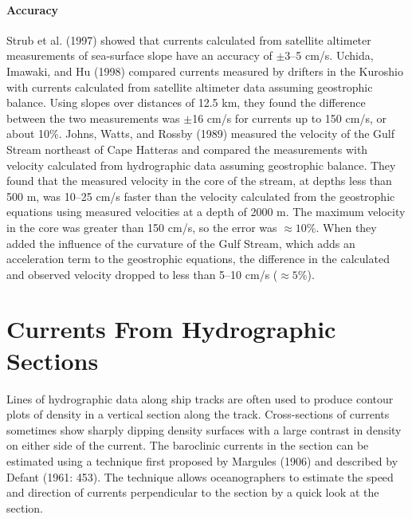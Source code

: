 \paragraph{Accuracy} Strub et al. (1997) showed that
currents calculated from satellite altimeter
measurements of sea-surface slope have an accuracy of
$\pm$3--5 cm/s. Uchida, Imawaki, and Hu (1998) compared currents measured by
drifters in the Kuroshio
with currents calculated from satellite altimeter data assuming
geostrophic balance. Using slopes over distances of 12.5 km, they found the difference between
the two measurements was
$\pm$16 cm/s for currents up to 150 cm/s, or about 10\%. Johns, Watts, and Rossby (1989)
measured the velocity of the Gulf Stream
northeast of Cape Hatteras and compared the measurements with velocity calculated from
hydrographic data assuming geostrophic
balance. They found that the measured velocity in the core of the stream, at depths less than
500 m, was 10--25 cm/s faster than the velocity calculated from the geostrophic equations
using measured velocities at a depth of 2000 m. The maximum velocity in the core was
greater than 150 cm/s, so the error was $\approx 10$\%. When they added the influence of the
curvature of the Gulf Stream, which adds an acceleration term to the geostrophic equations, the
difference in the calculated and observed velocity dropped to less than 5--10 cm/s ($\approx
5$\%).

\section{Currents From Hydrographic Sections}
Lines of hydrographic data along ship tracks are often used to
produce contour plots of density in a vertical section along the track. Cross-sections of
currents sometimes show sharply dipping density surfaces with a large contrast in density on
either side of the current. The baroclinic currents in the section can be estimated using a
technique first proposed by Margules (1906) and described by Defant (1961: 453). The
technique allows oceanographers to estimate the speed and direction of currents perpendicular
to the section by a quick look at the section.

